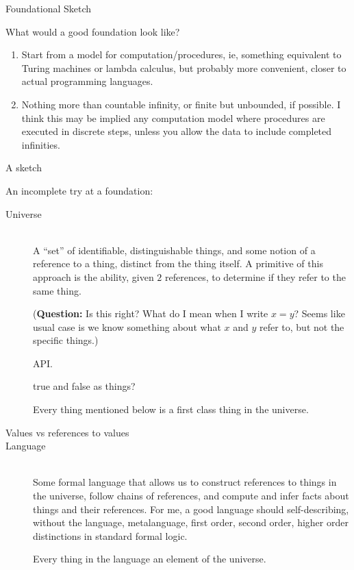 \begin{plSection}{Foundational Sketch}
\begin{plSection}{What would a good foundation look like?}
\begin{enumerate}
  \item Start from a model for computation/procedures, ie, something 
  equivalent to
  Turing machines or lambda calculus, but probably more convenient,
  closer to actual programming languages.
  
  \item Nothing more than countable infinity, or finite but unbounded,
  if possible.
  I think this may be implied any computation model where
  procedures are executed in discrete steps, unless you allow
  the data to include completed infinities.
\end{enumerate}

\end{plSection}%
\begin{plSection}{A sketch}
\label{sec:sketch}

An incomplete try at a foundation:
\begin{description}

\item[Universe]\mbox{}\\
A ``set'' of identifiable, distinguishable
things,
and some notion of a reference to a thing, distinct from the thing
itself.
A primitive of this approach is the ability, given $2$ references,
to determine if they refer to the same thing.
\par
(\textbf{Question:}
Is this right? What do I mean when I write $x=y$?
Seems like usual case is we know something about what $x$ and $y$
refer to, but not the specific things.)
\par
API. 
\par
\textsf{true} and \textsf{false} as things?
\par
Every thing mentioned below is a first class thing in the universe.

\item[Values vs references to values]%

\item[Language]\mbox{}\\
Some formal language that allows us 
to construct references to things in the universe, 
follow chains of references, and compute and infer facts 
about things and their references. 
For me, a good language should self-describing, without the
language, metalanguage, first order, second order, higher order 
distinctions in standard formal logic.
\par
Every thing in the language an element of the universe.


\end{description}
\end{plSection}
\end{plSection}
